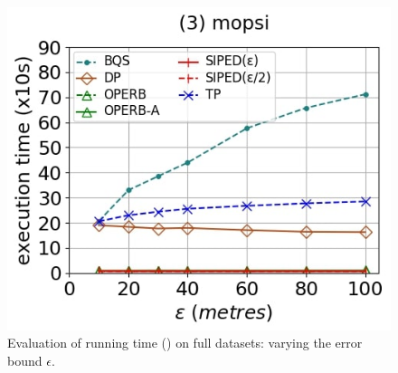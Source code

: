 {\begin{figure}[tb!]
	\includegraphics[scale=0.250]{Figures/Exp-PED-time-epsilon-mopsi.jpg}	
	\vspace{-2ex}
	\caption{\small Evaluation of running time (\ped) on full datasets: varying the error bound $\epsilon$.}\label{fig:time-epsilon-ped}
	\vspace{-2ex}
\end{figure}

}
